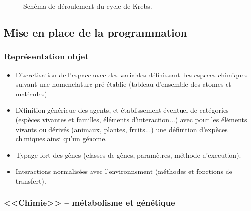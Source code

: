 \documentclass[11pt,twoside,a4paper]{article}
\begin{document}
\begin{figure}[H]
	\centerline {}
	\caption{Sch{\'e}ma de d{\'e}roulement du cycle de Krebs. }
	\label{fig:cycleDeKrebs}
\end{figure}

\clearpage

\subsection{Mise en place de la programmation}

\subsubsection{Repr{\'e}sentation objet}

\begin{itemize}
	\item Discretisation de l'espace avec des variables d{\'e}finissant des esp{\`e}ces chimiques suivant une nomenclature pr{\'e}-{\'e}tablie (tableau d'ensemble des atomes et mol{\'e}cules). 
	\item D{\'e}finition g{\'e}n{\'e}rique des agents, et {\'e}tablissement {\'e}ventuel de cat{\'e}gories (esp{\`e}ces vivantes et familles, {\'e}l{\'e}ments d'interaction...) avec pour les {\'e}l{\'e}ments vivants ou d{\'e}riv{\'e}s (animaux, plantes, fruits...) une d{\'e}finition d'exp{\`e}ces chimiques ainsi qu'un g{\'e}nome. 
	\item Typage fort des g{\`e}nes (classes de g{\`e}nes, param{\`e}tres, m{\'e}thode d'execution). 
	\item Interactions normalis{\'e}es avec l'environnement (m{\'e}thodes et fonctions de transfert). 
\end{itemize}

\subsubsection{<<Chimie>> -- m{\'e}tabolisme et g{\'e}n{\'e}tique}
\end{document}
